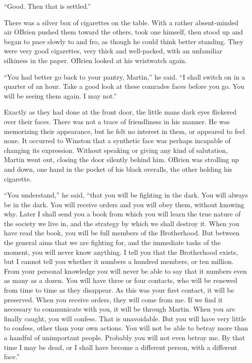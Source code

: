 ``Good. Then that is settled.''

There was a silver box of cigarettes on the table. With a rather
absent-minded air O\textquotesingle Brien pushed them toward the others,
took one himself, then stood up and began to pace slowly to and fro, as
though he could think better standing. They were very good cigarettes,
very thick and well-packed, with an unfamiliar silkiness in the paper.
O\textquotesingle Brien looked at his wristwatch again.

``You had better go back to your pantry, Martin,'' he said. ``I shall
switch on in a quarter of an hour. Take a good look at these
comrades\textquotesingle{} faces before you go. You will be seeing them
again. I may not.''

Exactly as they had done at the front door, the little
man\textquotesingle s dark eyes flickered over their faces. There was
not a trace of friendliness in his manner. He was memorizing their
appearance, but he felt no interest in them, or appeared to feel none.
It occurred to Winston that a synthetic face was perhaps incapable of
changing its expression. Without speaking or giving any kind of
salutation, Martin went out, closing the door silently behind him.
O\textquotesingle Brien was strolling up and down, one hand in the
pocket of his black overalls, the other holding his cigarette.

``You understand,'' he said, ``that you will be fighting in the dark. You
will always be in the dark. You will receive orders and you will obey
them, without knowing why. Later I shall send you a book from which you
will learn the true nature of the society we live in, and the strategy
by which we shall destroy it. When you have read the book, you will be
full members of the Brotherhood. But between the general aims that we
are fighting for, and the immediate tasks of the moment, you will never
know anything. I tell you that the Brotherhood exists, but I cannot tell
you whether it numbers a hundred members, or ten million. From your
personal knowledge you will never be able to say that it numbers even as
many as a dozen. You will have three or four contacts, who will be
renewed from time to time as they disappear. As this was your first
contact, it will be preserved. When you receive orders, they will come
from me. If we find it necessary to communicate with you, it will be
through Martin. When you are finally caught, you will confess. That is
unavoidable. But you will have very little to confess, other than your
own actions. You will not be able to betray more than a handful of
unimportant people. Probably you will not even betray me. By that time I
may be dead, or I shall have become a different person, with a different
face.''

